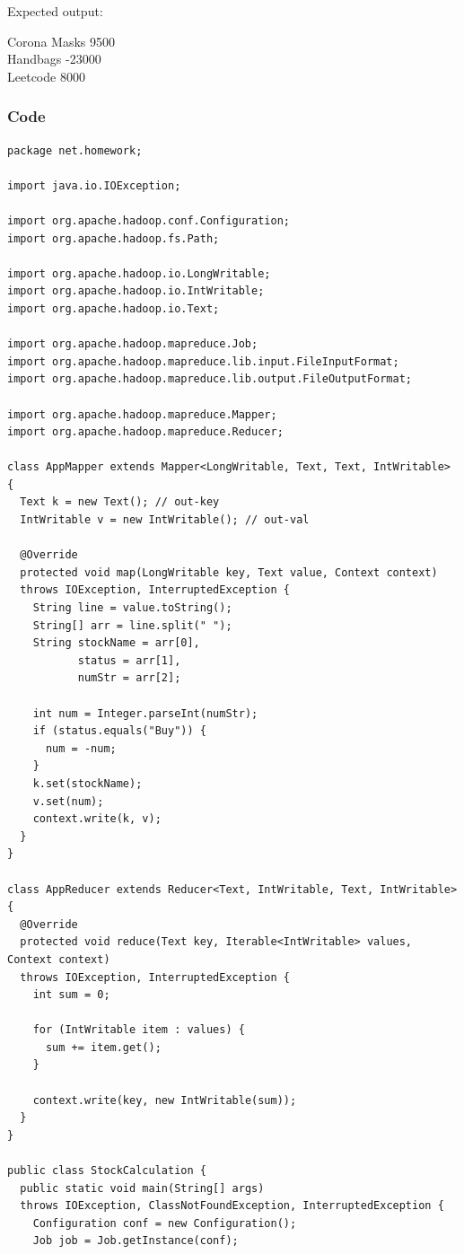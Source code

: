 \documentclass{article}
\begin{document}
    \noindent Expected output:

    \noindent Corona Masks 9500 \\
    Handbags -23000 \\
    Leetcode 8000

    \subsubsection{Code}

    \begin{center}
\begin{verbatim}
package net.homework;

import java.io.IOException;

import org.apache.hadoop.conf.Configuration;
import org.apache.hadoop.fs.Path;

import org.apache.hadoop.io.LongWritable;
import org.apache.hadoop.io.IntWritable;
import org.apache.hadoop.io.Text;

import org.apache.hadoop.mapreduce.Job;
import org.apache.hadoop.mapreduce.lib.input.FileInputFormat;
import org.apache.hadoop.mapreduce.lib.output.FileOutputFormat;

import org.apache.hadoop.mapreduce.Mapper;
import org.apache.hadoop.mapreduce.Reducer;

class AppMapper extends Mapper<LongWritable, Text, Text, IntWritable> {
  Text k = new Text(); // out-key
  IntWritable v = new IntWritable(); // out-val

  @Override
  protected void map(LongWritable key, Text value, Context context)
  throws IOException, InterruptedException {
    String line = value.toString();
    String[] arr = line.split(" ");
    String stockName = arr[0],
           status = arr[1],
           numStr = arr[2];

    int num = Integer.parseInt(numStr);
    if (status.equals("Buy")) {
      num = -num;
    }
    k.set(stockName);
    v.set(num);
    context.write(k, v);
  }
}

class AppReducer extends Reducer<Text, IntWritable, Text, IntWritable> {
  @Override
  protected void reduce(Text key, Iterable<IntWritable> values, Context context)
  throws IOException, InterruptedException {
    int sum = 0;

    for (IntWritable item : values) {
      sum += item.get();
    }

    context.write(key, new IntWritable(sum));
  }
}

public class StockCalculation {
  public static void main(String[] args)
  throws IOException, ClassNotFoundException, InterruptedException {
    Configuration conf = new Configuration();
    Job job = Job.getInstance(conf);


\end{verbatim}
\end{center}
\end{document}
